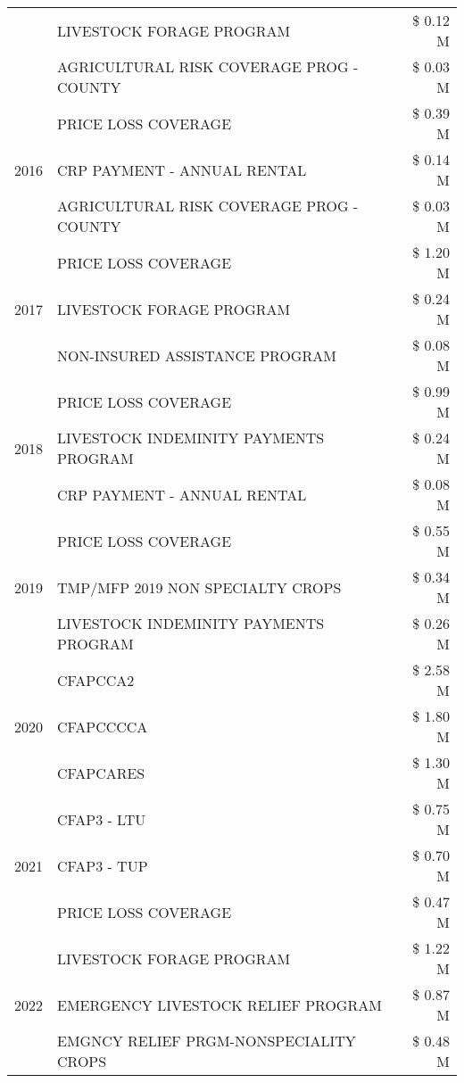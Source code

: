\begin{tabular}{llr}
 & LIVESTOCK FORAGE PROGRAM & \$ 0.12 M \\
 & AGRICULTURAL RISK COVERAGE PROG - COUNTY & \$ 0.03 M \\
\cline{1-3}
\multirow[t]{3}{*}{2016} & PRICE LOSS COVERAGE & \$ 0.39 M \\
 & CRP PAYMENT - ANNUAL RENTAL & \$ 0.14 M \\
 & AGRICULTURAL RISK COVERAGE PROG - COUNTY & \$ 0.03 M \\
\cline{1-3}
\multirow[t]{3}{*}{2017} & PRICE LOSS COVERAGE & \$ 1.20 M \\
 & LIVESTOCK FORAGE PROGRAM & \$ 0.24 M \\
 & NON-INSURED ASSISTANCE PROGRAM & \$ 0.08 M \\
\cline{1-3}
\multirow[t]{3}{*}{2018} & PRICE LOSS COVERAGE & \$ 0.99 M \\
 & LIVESTOCK INDEMINITY PAYMENTS PROGRAM & \$ 0.24 M \\
 & CRP PAYMENT - ANNUAL RENTAL & \$ 0.08 M \\
\cline{1-3}
\multirow[t]{3}{*}{2019} & PRICE LOSS COVERAGE & \$ 0.55 M \\
 & TMP/MFP 2019 NON SPECIALTY CROPS & \$ 0.34 M \\
 & LIVESTOCK INDEMINITY PAYMENTS PROGRAM & \$ 0.26 M \\
\cline{1-3}
\multirow[t]{3}{*}{2020} & CFAPCCA2 & \$ 2.58 M \\
 & CFAPCCCCA & \$ 1.80 M \\
 & CFAPCARES & \$ 1.30 M \\
\cline{1-3}
\multirow[t]{3}{*}{2021} & CFAP3 - LTU & \$ 0.75 M \\
 & CFAP3 - TUP & \$ 0.70 M \\
 & PRICE LOSS COVERAGE & \$ 0.47 M \\
\cline{1-3}
\multirow[t]{3}{*}{2022} & LIVESTOCK FORAGE PROGRAM & \$ 1.22 M \\
 & EMERGENCY LIVESTOCK RELIEF PROGRAM & \$ 0.87 M \\
 & EMGNCY RELIEF PRGM-NONSPECIALITY CROPS & \$ 0.48 M \\
\cline{1-3}
\bottomrule
\end{tabular}
